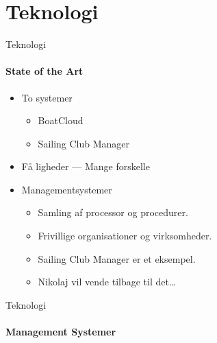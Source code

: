 \section{Teknologi}

\begin{frame}{Teknologi}
  \framesubtitle{State of the Art}
  
  \begin{itemize}
    \item To systemer
    \begin{itemize}
      \item BoatCloud
      \item Sailing Club Manager
    \end{itemize}
    \item Få ligheder --- Mange forskelle
    \vspace{2mm}
    \item Managementsystemer
    \begin{itemize}
      \item Samling af processor og procedurer.
      \item Frivillige organisationer og virksomheder.
      \item Sailing Club Manager er et eksempel.
      \item Nikolaj vil vende tilbage til det\ldots
    \end{itemize}
  \end{itemize}
\end{frame}

\begin{frame}{Teknologi}
  \framesubtitle{Management Systemer}
  
\end{frame}